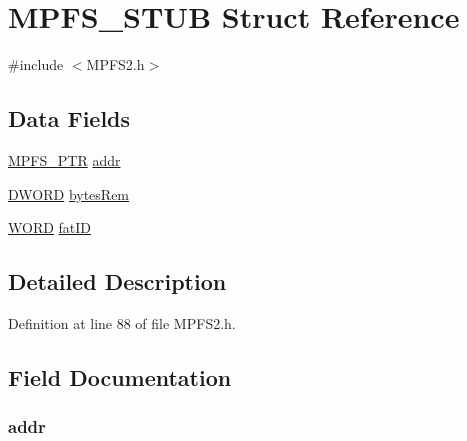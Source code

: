 \hypertarget{struct_m_p_f_s___s_t_u_b}{}\section{M\+P\+F\+S\+\_\+\+S\+T\+U\+B Struct Reference}
\label{struct_m_p_f_s___s_t_u_b}


{\ttfamily \#include $<$M\+P\+F\+S2.\+h$>$}

\subsection*{Data Fields}
\begin{DoxyCompactItemize}
\item 
\hyperlink{_m_p_f_s2_8h_a806f561996c55b507dbe4efbf4c463da}{M\+P\+F\+S\+\_\+\+P\+T\+R} \hyperlink{struct_m_p_f_s___s_t_u_b_a7e16fe945febafa696d64b12a929d8f4}{addr}
\item 
\hyperlink{_generic_type_defs_8h_ad342ac907eb044443153a22f964bf0af}{D\+W\+O\+R\+D} \hyperlink{struct_m_p_f_s___s_t_u_b_a238767e23c285d139b24816de23910ba}{bytes\+Rem}
\item 
\hyperlink{_generic_type_defs_8h_a2b0e863dadf920709ec53d9088ee7c91}{W\+O\+R\+D} \hyperlink{struct_m_p_f_s___s_t_u_b_a80d2cce88ce89c9be913461577878a94}{fat\+I\+D}
\end{DoxyCompactItemize}


\subsection{Detailed Description}


Definition at line 88 of file M\+P\+F\+S2.\+h.



\subsection{Field Documentation}
\hypertarget{struct_m_p_f_s___s_t_u_b_a7e16fe945febafa696d64b12a929d8f4}{}
\subsubsection[{addr}]{ addr}\label{struct_m_p_f_s___s_t_u_b_a7e16fe945febafa696d64b12a929d8f4}


